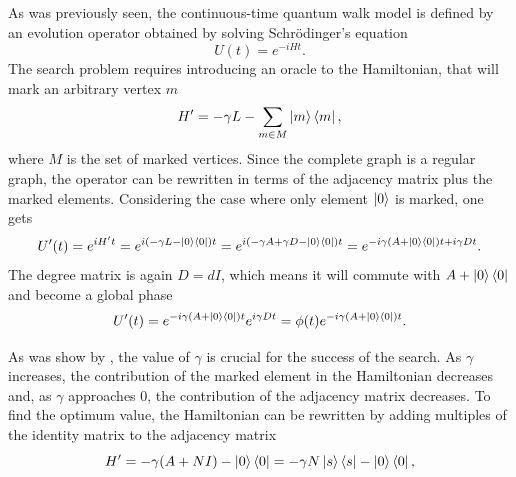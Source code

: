 \documentclass[../../dissertation.tex]{subfiles}
\begin{document}
As was previously seen, the continuous-time quantum walk model is defined by an
evolution operator obtained by solving Schrödinger's equation
\begin{equation}
	U(t) = e^{-iHt}.
\end{equation}
The search problem requires introducing an oracle to the Hamiltonian, that will
mark an arbitrary vertex $m$ 
\begin{equation}
	H' = -\gamma L - \sum_{m \in M}\ket{m}\bra{m},
\end{equation}
where $M$ is the set of marked vertices. Since the complete graph is a regular graph, the operator can be rewritten in terms of the adjacency matrix plus the marked elements. Considering the case where only element $\ket{0}$ is marked, one gets
\begin{equation}
	U'(t) = e^{iH't} = e^{i(-\gamma L - \ket{0}\bra{0})t} = e^{i(-\gamma A + \gamma D - \ket{0}\bra{0})t} = e^{-i\gamma(A+\ket{0}\bra{0})t + i\gamma D t}.
\end{equation}
The degree matrix is again $D=dI$, which means it will commute with $A+\ket{0}\bra{0}$ and become a global phase
\begin{equation}
	U'(t) = e^{-i\gamma(A+\ket{0}\bra{0})t}e^{i\gamma D t} = \phi(t)e^{-i\gamma(A+\ket{0}\bra{0})t}.
\end{equation}\par
As was show by \cite{childs2004}, the value of $\gamma$ is crucial for the
success of the search. As $\gamma$ increases, the contribution of the marked
element in the Hamiltonian decreases and, as $\gamma$ approaches $0$, the
contribution of the adjacency matrix decreases. To find the optimum value, the
Hamiltonian can be rewritten by adding multiples of the identity matrix to the
adjacency matrix 
\begin{equation}
	H' = -\gamma(A+NI) - \ket{0}\bra{0} = -\gamma N\ket{s}\bra{s} - \ket{0}\bra{0},
\end{equation}
\end{document}
